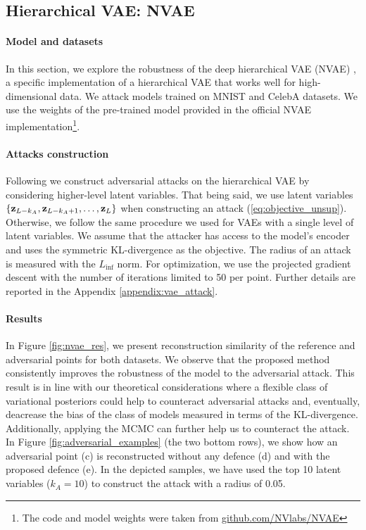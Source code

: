 {\subsection{Hierarchical VAE: NVAE}\label{sec:nvae}

\paragraph{Model and datasets} In this section, we explore the robustness of the deep hierarchical VAE (NVAE) \cite{vahdat2020nvae}, a specific implementation of a hierarchical VAE that works well for high-dimensional data. We attack models trained on MNIST and CelebA \cite{liu2015faceattributes} datasets. We use the weights of the pre-trained model provided in the official NVAE implementation\footnote{The code and model weights were taken from \url{github.com/NVlabs/NVAE}}. 

\paragraph{Attacks construction}
Following \cite{kuzina2021adv} we construct adversarial attacks on the hierarchical VAE by considering higher-level latent variables. That being said, we use latent variables $\{{\mathbf{z}}_{L-k_A}, {\mathbf{z}}_{L-k_A+1}, \dots, {\mathbf{z}}_L\}$ when constructing an attack (\eqref{eq:objective_unsup}). Otherwise, we follow the same procedure we used for VAEs with a single level of latent variables. We assume that the attacker has access to the model's encoder and uses the symmetric KL-divergence as the objective. The radius of an attack is measured with the $L_{\inf}$ norm. For optimization, we use the projected gradient descent with the number of iterations limited to 50 per point. Further details are reported in the Appendix \ref{appendix:vae_attack}.


\paragraph{Results}
In Figure \ref{fig:nvae_res}, we present reconstruction similarity of the reference and adversarial points for both datasets. We observe that the proposed method consistently improves the robustness of the model to the adversarial attack. This result is in line with our theoretical considerations where a flexible class of variational posteriors could help to counteract adversarial attacks and, eventually, deacrease the bias of the class of models measured in terms of the KL-divergence. Additionally, applying the MCMC can further help us to counteract the attack. In Figure \ref{fig:adversarial_examples} (the two bottom rows), we show how an adversarial point (c) is reconstructed without any defence (d) and with the proposed defence (e). In the depicted samples, we have used the top 10 latent variables ($k_A = 10$) to construct the attack with a radius of 0.05. 



}
